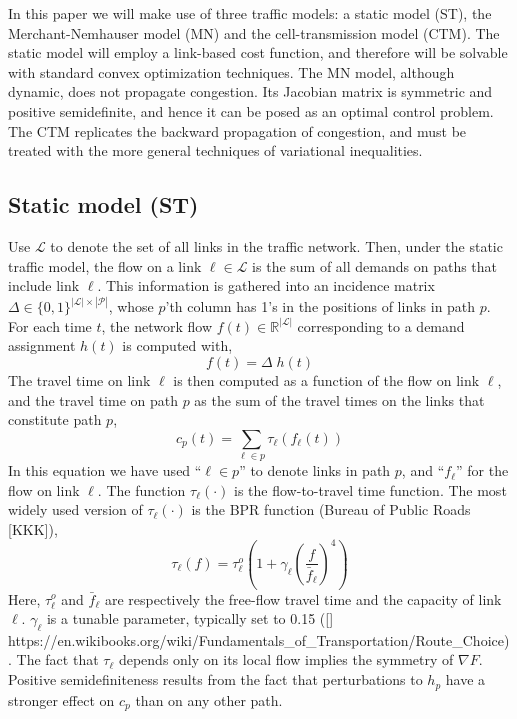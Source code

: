 In this paper we will make use of three traffic models: a static model (ST), the Merchant-Nemhauser model (MN) and the cell-transmission model (CTM). The static model will employ a link-based cost function, and therefore will be solvable with standard convex optimization techniques. The MN model, although dynamic, does not propagate congestion. Its Jacobian matrix is symmetric and positive semidefinite, and hence it can be posed as an optimal control problem. The CTM replicates the backward propagation of congestion, and must be treated with the more general techniques of variational inequalities. 

\subsection{Static model (ST)}
Use $\mathcal{L}$ to denote the set of all links in the traffic network. Then, under the static traffic model, the flow on a link $\ell\in\mathcal{L}$ is the sum of all demands on paths that include link $\ell$. This information is gathered into an incidence matrix 
$\Delta\in\{0,1\}^{|\mathcal{L}|\times|\mathcal{P}|}$, whose $p$'th column has 1's in the positions of links in path $p$. For each time $t$, the network flow $f(t)\in\mathbb{R}^{|\mathcal{L}|}$ corresponding to a demand assignment $h(t)$ is computed with,
\begin{equation}
f(t) = \Delta \; h(t) 
\end{equation}
The travel time on link $\ell$ is then computed as a function of the flow on link $\ell$, and the travel time on path $p$ as the sum of the travel times on the links that constitute path $p$,
\begin{equation}
c_p(t) = \sum_{\ell\in p} \tau_\ell(f_\ell(t))
\end{equation}
In this equation we have used ``$\ell\in p$'' to denote links in path $p$, and ``$f_\ell$'' for the flow on link $\ell$. The function $\tau_\ell(\cdot)$ is the flow-to-travel time function. The most widely used version of $\tau_\ell(\cdot)$ is the BPR function (Bureau of Public Roads [KKK]),
\begin{equation}
\label{eq:bpr}
\tau_\ell(f) = \tau^o_\ell\left( 1 + \gamma_\ell  \left( \frac{f}{\bar{f}_\ell} \right)^4 \right)
\end{equation}
Here, $\tau^o_\ell$ and $\bar{f}_\ell$ are respectively the free-flow travel time and the capacity of link $\ell$. $\gamma_\ell$ is a tunable parameter, typically set to 0.15 ([\XXX] https://en.wikibooks.org/wiki/Fundamentals_of_Transportation/Route_Choice). The fact that $\tau_\ell$ depends only on its local flow implies the symmetry of $\nabla F$. Positive semidefiniteness results from the fact that perturbations to $h_p$ have a stronger effect on $c_p$ than on any other path. 

